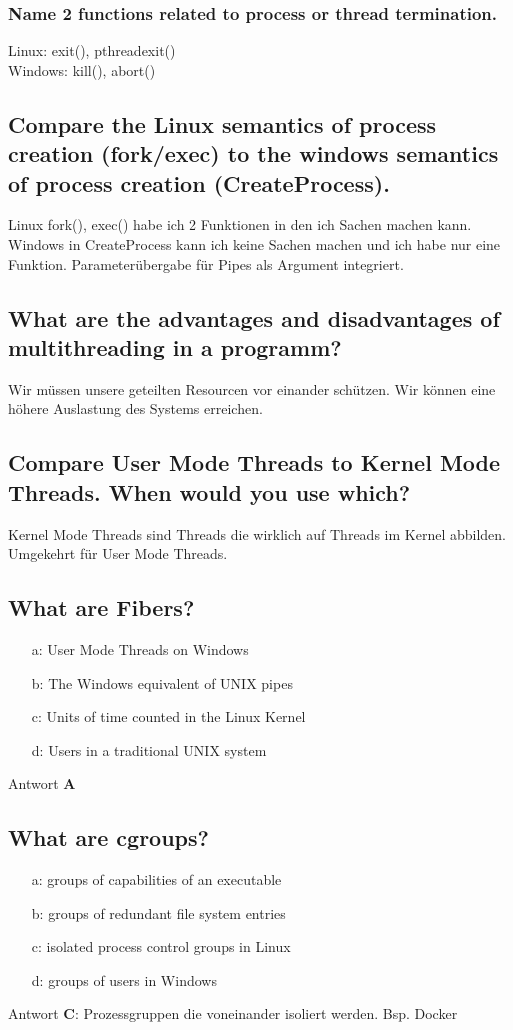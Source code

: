 \subsubsection{Name 2 functions related to process or thread termination.}
Linux: exit(), pthreadexit()\\Windows: kill(), abort()

\subsection{\important Compare the Linux semantics of process creation (fork/exec) to the windows semantics of process creation (CreateProcess).}
Linux fork(), exec() habe ich 2 Funktionen in den ich Sachen machen kann.\\
Windows in CreateProcess kann ich keine Sachen machen und ich habe nur eine Funktion. Parameter\"ubergabe f\"ur Pipes als Argument integriert.

\subsection{\important What are the advantages and disadvantages of multithreading in a programm?}
Wir m\"ussen unsere geteilten Resourcen vor einander sch\"utzen. Wir k\"onnen eine h\"ohere Auslastung des Systems erreichen.

\subsection{Compare User Mode Threads to Kernel Mode Threads. When would you use which?}
Kernel Mode Threads sind Threads die wirklich auf Threads im Kernel abbilden. Umgekehrt f\"ur User Mode Threads.

\subsection{What are Fibers?}
\begin{itemize}
	\setlength\itemsep{-0.5em}
	\item[a:] User Mode Threads on Windows
	\item[b:] The Windows equivalent of UNIX pipes
	\item[c:] Units of time counted in the Linux Kernel
	\item[d:] Users in a traditional UNIX system
\end{itemize}
Antwort \textbf{A}

\subsection{What are cgroups?}
\begin{itemize}
	\setlength\itemsep{-0.5em}
	\item[a:] groups of capabilities of an executable
	\item[b:] groups of redundant file system entries
	\item[c:] isolated process control groups in Linux
	\item[d:] groups of users in Windows
\end{itemize}
Antwort \textbf{C}: Prozessgruppen die voneinander isoliert werden. Bsp. Docker

